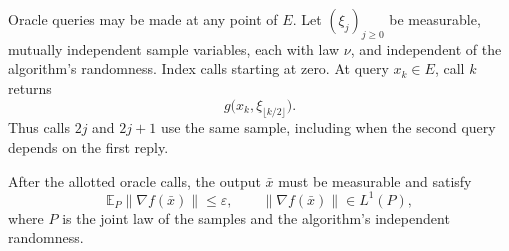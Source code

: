 \documentclass[10pt]{article}
\theoremstyle{definition}
\begin{document}
Oracle queries may be made at any point of $E$. Let $(\xi_j)_{j\geq0}$ be measurable, mutually independent sample variables, each with law $\nu$, and independent of the algorithm's randomness. Index calls starting at zero. At query $x_k\in E$, call $k$ returns
\[
g\bigl(x_k,\xi_{\lfloor k/2\rfloor}\bigr).
\]
Thus calls $2j$ and $2j+1$ use the same sample, including when the second query depends on the first reply.

After the allotted oracle calls, the output $\bar{x}$ must be measurable and satisfy
\[
\mathbb{E}_{P}\|\nabla f(\bar{x})\|\leq\varepsilon,
\qquad
\|\nabla f(\bar{x})\|\in L^1(P),
\]
where $P$ is the joint law of the samples and the algorithm's independent randomness.
\end{document}
